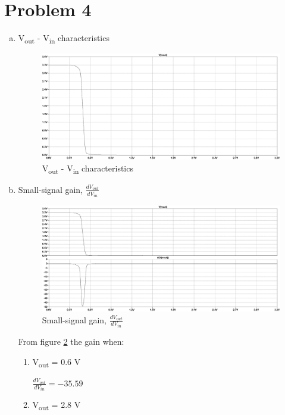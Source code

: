 \documentclass{article}
\begin{document}
\section{Problem 4}
\label{sec:org7839784}
\begin{enumerate}[(a)]
\item V\textsubscript{out} - V\textsubscript{in} characteristics
\begin{figure}[H]
\centering
\includegraphics[width=.9\linewidth]{img/q4/a.pdf}
\caption{\label{fig:vout-q4}V\textsubscript{out} - V\textsubscript{in} characteristics}
\end{figure}
\item Small-signal gain, \(\frac{dV_{out}}{dV_{in}}\)
\begin{figure}[H]
\centering
\includegraphics[width=.9\linewidth]{img/q4/b.pdf}
\caption{\label{fig:dvout-q4}Small-signal gain, \(\frac{dV_{out}}{dV_{in}}\)}
\end{figure}

From figure \ref{fig:dvout-q4} the gain when:
\begin{enumerate}[1.]
\item V\textsubscript{out} = 0.6 V

\(\frac{dV_{out}}{dV_{in}} = -35.59\)
\item V\textsubscript{out} = 2.8 V


\end{enumerate}
\end{enumerate}
\end{document}
